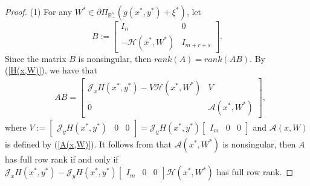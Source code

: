 \documentclass[11pt]{article}
\theoremstyle{definition}
\theoremstyle{remark}
\numberwithin{equation}{section}
\begin{document}
\begin{proof}
(1) For any $ W^*\in \partial\Pi_{\mathbb{R}_{-}^s}(g(x^*,y^*)+\xi^*)$, let
$$B:=\left[\begin{array}{cc}
                I_n & 0  \\
                 -\mathcal{H}(x^*,W^*)&I_{m+r+s}
              \end{array}\right].$$
Since the matrix $B$ is nonsingular, then $rank(A)=rank(AB)$.
                By (\ref{H(x,W)}), we have that
 \begin{align*}
   &AB=\left[\begin{array}{cc}
                \mathcal{J}_xH(x^*,y^*)-
                V\mathcal{H}(x^*,W^*)&V\\
                0&\mathcal{A}(x^*,W^*)
              \end{array}\right],
              \end{align*}
  where $V:=[\begin{array}{ccc}
       \mathcal{J}_yH(x^*,y^*) &0 & 0
        \end{array}]=\mathcal{J}_yH(x^*,y^*) [\begin{array}{ccc}
          I_m &0 & 0
            \end{array}]$ and $ \mathcal{A}(x,W )$ is defined by (\ref{A(x,W)}).
 It follows from \cite[Proposition 2.2]{Daiyh and Zhanglw} that $\mathcal{A}(x^*,W^*)$  is nonsingular,
  then $A$ has full row rank if and only if
  $\mathcal{J}_xH(x^*,y^*)-\mathcal{J}_yH(x^*,y^*)[\begin{array}{ccc}
          I_m &0 & 0
            \end{array}] \mathcal{H}(x^*,W^*)$ has full row rank.


\end{proof}
\end{document}
